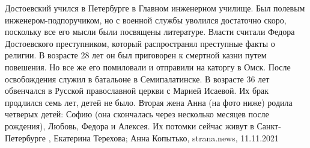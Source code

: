  
 
 
 
 


Достоевский учился в Петербурге в Главном инженерном училище. Был полевым
инженером-подпоручиком, но с военной службы уволился достаточно скоро,
поскольку все его мысли были посвящены литературе.  Власти считали Федора
Достоевского преступником, который распространял преступные факты о религии. В
возрасте 28 лет он был приговорен к смертной казни путем повешения. Но все же
его помиловали и отправили на каторгу в Омск.  После освобождения служил в
батальоне в Семипалатинске.  В возрасте 36 лет обвенчался в Русской
православной церкви с Марией Исаевой. Их брак продлился семь лет, детей не
было.  Вторая жена Анна (на фото ниже) родила четверых детей: Софию (она
скончалась через несколько месяцев после рождения), Любовь, Федора и Алексея.
Их потомки сейчас живут в Санкт-Петербурге
, 
Екатерина Терехова; Анна Копытько, strana.news, 11.11.2021
